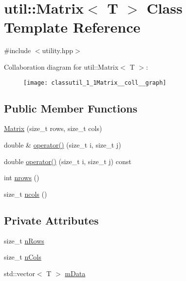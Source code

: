 \hypertarget{classutil_1_1Matrix}{}\section{util\+:\+:Matrix$<$ T $>$ Class Template Reference}
\label{classutil_1_1Matrix}


{\ttfamily \#include $<$utility.\+hpp$>$}



Collaboration diagram for util\+:\+:Matrix$<$ T $>$\+:\nopagebreak
\begin{figure}[H]
\begin{center}
\leavevmode
\texttt{[image: classutil\_1\_1Matrix\_\_coll\_\_graph]}
\end{center}
\end{figure}
\subsection*{Public Member Functions}
\begin{DoxyCompactItemize}
\item 
\hyperlink{classutil_1_1Matrix_aa68ae4682b48d4f40bc2a3ef0ed75976}{Matrix} (size\+\_\+t rows, size\+\_\+t cols)
\item 
double \& \hyperlink{classutil_1_1Matrix_a7c2d260e685310c403600ed18f02f967}{operator()} (size\+\_\+t i, size\+\_\+t j)
\item 
double \hyperlink{classutil_1_1Matrix_a1cdfea411728de3e4028d44cfbb4b54a}{operator()} (size\+\_\+t i, size\+\_\+t j) const
\item 
int \hyperlink{classutil_1_1Matrix_a58f84228a561ec5152e8fd9d3800e7bc}{nrows} ()
\item 
size\+\_\+t \hyperlink{classutil_1_1Matrix_a728bc44831ab516e0a46c1c342e8b996}{ncols} ()
\end{DoxyCompactItemize}
\subsection*{Private Attributes}
\begin{DoxyCompactItemize}
\item 
size\+\_\+t \hyperlink{classutil_1_1Matrix_a1d981a6aa70209f8cf1e3fb7a0820240}{n\+Rows}
\item 
size\+\_\+t \hyperlink{classutil_1_1Matrix_ae93dd1e2ede96c42b2035a69e4a14083}{n\+Cols}
\item 
std\+::vector$<$ T $>$ \hyperlink{classutil_1_1Matrix_ad8ef42880d189249c526aca3825be2cf}{m\+Data}
\end{DoxyCompactItemize}


